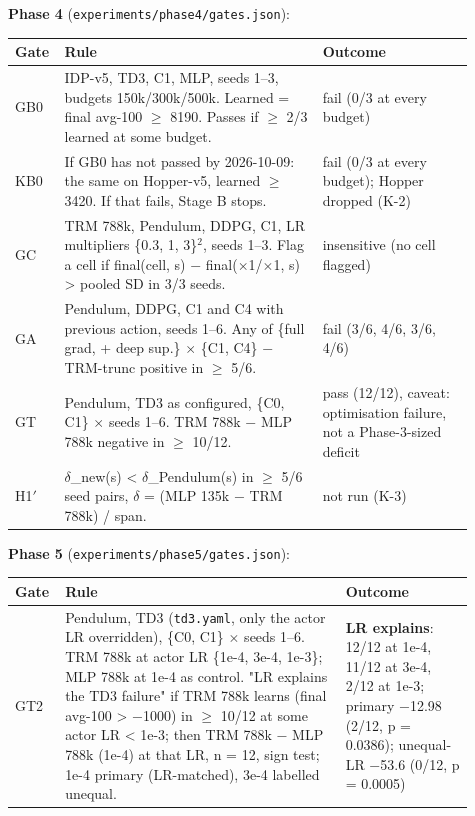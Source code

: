 \documentclass[11pt]{article}
\begin{document}
\textbf{Phase 4} (\texttt{experiments/\allowbreak{}phase4/\allowbreak{}gates.\allowbreak{}json}):



\begin{center}\small\begin{tabular}{>{\raggedright\arraybackslash}p{0.058\linewidth}>{\raggedright\arraybackslash}p{0.533\linewidth}>{\raggedright\arraybackslash}p{0.315\linewidth}}
\toprule
Gate & Rule & Outcome \\
\midrule
GB0 & IDP-v5, TD3, C1, MLP, seeds 1--3, budgets 150k/300k/500k. Learned = final avg-100 $\geq$ 8190. Passes if $\geq$ 2/3 learned at some budget. & fail (0/3 at every budget) \\
KB0 & If GB0 has not passed by 2026-10-09: the same on Hopper-v5, learned $\geq$ 3420. If that fails, Stage B stops. & fail (0/3 at every budget); Hopper dropped (K-2) \\
GC & TRM 788k, Pendulum, DDPG, C1, LR multipliers \{0.3, 1, 3\}$^2$, seeds 1--3. Flag a cell if final(cell, s) $-$ final($\times$1/$\times$1, s) > pooled SD in 3/3 seeds. & insensitive (no cell flagged) \\
GA & Pendulum, DDPG, C1 and C4 with previous action, seeds 1--6. Any of \{full grad, + deep sup.\} $\times$ \{C1, C4\} $-$ TRM-trunc positive in $\geq$ 5/6. & fail (3/6, 4/6, 3/6, 4/6) \\
GT & Pendulum, TD3 as configured, \{C0, C1\} $\times$ seeds 1--6. TRM 788k $-$ MLP 788k negative in $\geq$ 10/12. & pass (12/12), caveat: optimisation failure, not a Phase-3-sized deficit \\
H1$'$ & $\delta$\_new(s) < $\delta$\_Pendulum(s) in $\geq$ 5/6 seed pairs, $\delta$ = (MLP 135k $-$ TRM 788k) / span. & not run (K-3) \\
\bottomrule
\end{tabular}\end{center}



\textbf{Phase 5} (\texttt{experiments/\allowbreak{}phase5/\allowbreak{}gates.\allowbreak{}json}):



\begin{center}\small\begin{tabular}{>{\raggedright\arraybackslash}p{0.063\linewidth}>{\raggedright\arraybackslash}p{0.577\linewidth}>{\raggedright\arraybackslash}p{0.266\linewidth}}
\toprule
Gate & Rule & Outcome \\
\midrule
GT2 & Pendulum, TD3 (\texttt{td3.yaml}, only the actor LR overridden), \{C0, C1\} $\times$ seeds 1--6. TRM 788k at actor LR \{1e-4, 3e-4, 1e-3\}; MLP 788k at 1e-4 as control. "LR explains the TD3 failure" if TRM 788k learns (final avg-100 > $-$1000) in $\geq$ 10/12 at some actor LR < 1e-3; then TRM 788k $-$ MLP 788k (1e-4) at that LR, n = 12, sign test; 1e-4 primary (LR-matched), 3e-4 labelled unequal. & \textbf{LR explains}: 12/12 at 1e-4, 11/12 at 3e-4, 2/12 at 1e-3; primary $-$12.98 (2/12, p = 0.0386); unequal-LR $-$53.6 (0/12, p = 0.0005) \\
\bottomrule
\end{tabular}\end{center}
\end{document}

